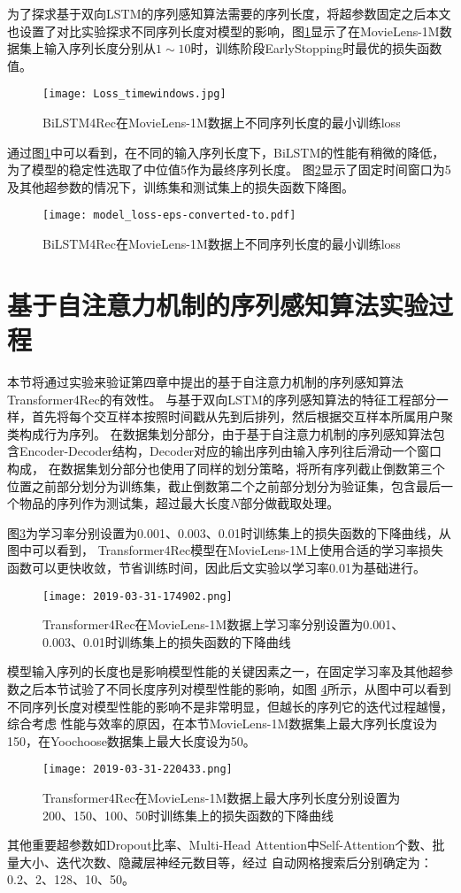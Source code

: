 为了探求基于双向LSTM的序列感知算法需要的序列长度，将超参数固定之后本文也设置了对比实验探求不同序列长度对模型的影响，图\ref{fig:windows}显示了在MovieLens-1M数据集上输入序列长度分别从$1\sim 10$时，训练阶段EarlyStopping时最优的损失函数值。
\begin{figure}[htb]%
  \centering
  \texttt{[image: Loss\_timewindows.jpg]}
  \caption{BiLSTM4Rec在MovieLens-1M数据上不同序列长度的最小训练loss}
  \label{fig:windows}
\end{figure}
通过图\ref{fig:windows}中可以看到，在不同的输入序列长度下，BiLSTM的性能有稍微的降低，为了模型的稳定性选取了中位值5作为最终序列长度。
图\ref{fig:BiLSTMloss}显示了固定时间窗口为5及其他超参数的情况下，训练集和测试集上的损失函数下降图。
\begin{figure}[htb]%
  \centering
  \texttt{[image: model\_loss-eps-converted-to.pdf]}
  \caption{BiLSTM4Rec在MovieLens-1M数据上不同序列长度的最小训练loss}
  \label{fig:BiLSTMloss}
\end{figure}

\section{基于自注意力机制的序列感知算法实验过程}
本节将通过实验来验证第四章中提出的基于自注意力机制的序列感知算法Transformer4Rec的有效性。
与基于双向LSTM的序列感知算法的特征工程部分一样，首先将每个交互样本按照时间戳从先到后排列，然后根据交互样本所属用户聚类构成行为序列。
在数据集划分部分，由于基于自注意力机制的序列感知算法包含Encoder-Decoder结构，Decoder对应的输出序列由输入序列往后滑动一个窗口构成，
在数据集划分部分也使用了同样的划分策略，将所有序列截止倒数第三个位置之前部分划分为训练集，截止倒数第二个之前部分划分为验证集，包含最后一个物品的序列作为测试集，超过最大长度$N$部分做截取处理。

图\ref{fig:Slefattentionloss}为学习率分别设置为0.001、0.003、0.01时训练集上的损失函数的下降曲线，从图中可以看到，
Transformer4Rec模型在MovieLens-1M上使用合适的学习率损失函数可以更快收敛，节省训练时间，因此后文实验以学习率0.01为基础进行。
\begin{figure}[htb]%
  \centering
  \texttt{[image: 2019-03-31-174902.png]}
  \caption{Transformer4Rec在MovieLens-1M数据上学习率分别设置为0.001、0.003、0.01时训练集上的损失函数的下降曲线}
  \label{fig:Slefattentionloss}
\end{figure}

模型输入序列的长度也是影响模型性能的关键因素之一，在固定学习率及其他超参数之后本节试验了不同长度序列对模型性能的影响，如图
\ref{fig:maxlenloss}所示，从图中可以看到不同序列长度对模型性能的影响不是非常明显，但越长的序列它的迭代过程越慢，综合考虑
性能与效率的原因，在本节MovieLens-1M数据集上最大序列长度设为150，在Yoochoose数据集上最大长度设为50。
\begin{figure}[htb]%
  \centering
  \texttt{[image: 2019-03-31-220433.png]}
  \caption{Transformer4Rec在MovieLens-1M数据上最大序列长度分别设置为200、150、100、50时训练集上的损失函数的下降曲线}
  \label{fig:maxlenloss}
\end{figure}
其他重要超参数如Dropout比率、Multi-Head Attention中Self-Attention个数、批量大小、迭代次数、隐藏层神经元数目等，经过
自动网格搜索后分别确定为：0.2、2、128、10、50。

